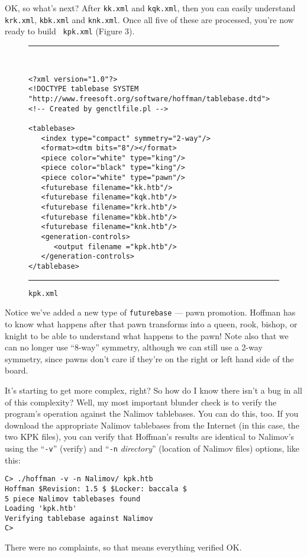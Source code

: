 \documentclass[11pt]{article}
\begin{document}
OK, so what's next?  After {\tt kk.xml} and {\tt kqk.xml}, then you
can easily understand {\tt krk.xml}, {\tt kbk.xml} and {\tt knk.xml}.
Once all five of these are processed, you're now ready to build {\tt
kpk.xml} (Figure 3).

\begin{figure}
\hrule\ 
{\small\begin{verbatim}
<?xml version="1.0"?>
<!DOCTYPE tablebase SYSTEM "http://www.freesoft.org/software/hoffman/tablebase.dtd">
<!-- Created by genctlfile.pl -->

<tablebase>
   <index type="compact" symmetry="2-way"/>
   <format><dtm bits="8"/></format>
   <piece color="white" type="king"/>
   <piece color="black" type="king"/>
   <piece color="white" type="pawn"/>
   <futurebase filename="kk.htb"/>
   <futurebase filename="kqk.htb"/>
   <futurebase filename="krk.htb"/>
   <futurebase filename="kbk.htb"/>
   <futurebase filename="knk.htb"/>
   <generation-controls>
      <output filename ="kpk.htb"/>
   </generation-controls>
</tablebase>
\end{verbatim}}
\hrule
\caption{\tt kpk.xml}
\end{figure}

Notice we've added a new type of {\tt futurebase} --- pawn promotion.
Hoffman has to know what happens after that pawn transforms into a
queen, rook, bishop, or knight to be able to understand what happens
to the pawn!  Note also that we can no longer use ``8-way'' symmetry,
although we can still use a 2-way symmetry, since pawns don't care if
they're on the right or left hand side of the board.

It's starting to get more complex, right?  So how do I know there
isn't a bug in all of this complexity?  Well, my most important
blunder check is to verify the program's operation against the Nalimov
tablebases.  You can do this, too.  If you download the appropriate
Nalimov tablebases from the Internet (in this case, the two KPK
files), you can verify that Hoffman's results are identical to
Nalimov's using the ``{\tt -v}'' (verify) and ``{\tt -n} {\it
directory}'' (location of Nalimov files) options, like this:

\begin{verbatim}
C> ./hoffman -v -n Nalimov/ kpk.htb
Hoffman $Revision: 1.5 $ $Locker: baccala $
5 piece Nalimov tablebases found
Loading 'kpk.htb'
Verifying tablebase against Nalimov
C>
\end{verbatim}

There were no complaints, so that means everything verified OK.
\end{document}
